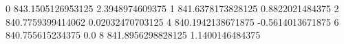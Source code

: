 0 843.1505126953125 2.3948974609375
1 841.6378173828125 0.8822021484375
2 840.7759399414062 0.02032470703125
4 840.1942138671875 -0.5614013671875
6 840.755615234375 0.0
8 841.8956298828125 1.1400146484375
